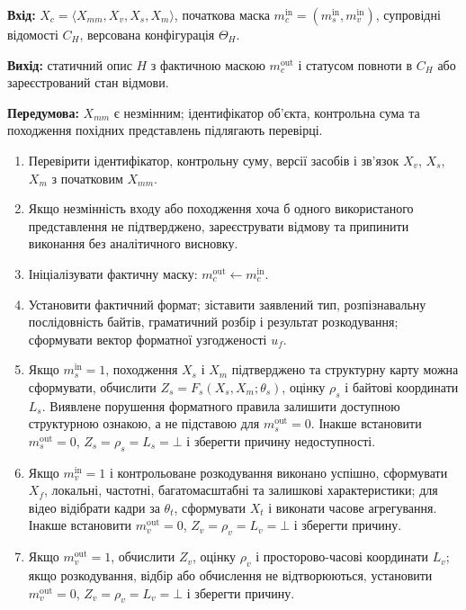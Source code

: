 \begin{algorithm}[H]
\begingroup
\fontsize{12}{13}\selectfont
{}
\setlength{\abovecaptionskip}{0pt}
\setlength{\belowcaptionskip}{2pt}
\caption{Формування статичного опису мультимедійного об’єкта}
\label{alg:svs_method}
\textbf{Вхід:} $X_c=\langle X_{mm},X_v,X_s,X_m\rangle$, початкова маска $m_c^{\mathrm{in}}=(m_s^{\mathrm{in}},m_v^{\mathrm{in}})$, супровідні відомості $C_H$, версована конфігурація $\Theta_H$.\par
\textbf{Вихід:} статичний опис $H$ з фактичною маскою $m_c^{\mathrm{out}}$ і статусом повноти в $C_H$ або зареєстрований стан відмови.\par
\textbf{Передумова:} $X_{mm}$ є незмінним; ідентифікатор об’єкта, контрольна сума та походження похідних представлень підлягають перевірці.\smallskip
\begin{enumerate}[label=\arabic*.,leftmargin=6mm,itemsep=1pt,topsep=2pt]
\item Перевірити ідентифікатор, контрольну суму, версії засобів і зв’язок $X_v$, $X_s$, $X_m$ з початковим $X_{mm}$.
\item Якщо незмінність входу або походження хоча б одного використаного представлення не підтверджено, зареєструвати відмову та припинити виконання без аналітичного висновку.
\item Ініціалізувати фактичну маску: $m_c^{\mathrm{out}}\leftarrow m_c^{\mathrm{in}}$.
\item Установити фактичний формат; зіставити заявлений тип, розпізнавальну послідовність байтів, граматичний розбір і результат розкодування; сформувати вектор форматної узгодженості $u_f$.
\item Якщо $m_s^{\mathrm{in}}=1$, походження $X_s$ і $X_m$ підтверджено та структурну карту можна сформувати, обчислити $Z_s=F_s(X_s,X_m;\theta_s)$, оцінку $\rho_s$ і байтові координати $L_s$. Виявлене порушення форматного правила залишити доступною структурною ознакою, а не підставою для $m_s^{\mathrm{out}}=0$. Інакше встановити $m_s^{\mathrm{out}}=0$, $Z_s=\rho_s=L_s=\bot$ і зберегти причину недоступності.
\item Якщо $m_v^{\mathrm{in}}=1$ і контрольоване розкодування виконано успішно, сформувати $X_f$, локальні, частотні, багатомасштабні та залишкові характеристики; для відео відібрати кадри за $\theta_t$, сформувати $X_t$ і виконати часове агрегування. Інакше встановити $m_v^{\mathrm{out}}=0$, $Z_v=\rho_v=L_v=\bot$ і зберегти причину.
\item Якщо $m_v^{\mathrm{out}}=1$, обчислити $Z_v$, оцінку $\rho_v$ і просторово-часові координати $L_v$; якщо розкодування, відбір або обчислення не відтворюються, установити $m_v^{\mathrm{out}}=0$, $Z_v=\rho_v=L_v=\bot$ і зберегти причину.

\end{enumerate}
\end{algorithm}
